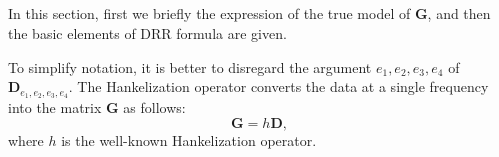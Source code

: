 %
%
%
%


\subsection{}

In this section, first we briefly  the expression of the true model of $\textbf{G}$, and then the basic elements of  DRR formula are given.

To simplify notation, it is better to disregard the argument {$e_1, e_2, e_3, e_4$} of {$\mathbf{D}_{e_1,e_2,e_3,e_4}$}. The Hankelization operator \citep{chen2016open,chen2016simultaneous,zhang2017hybrid} converts the  data at a single frequency into the matrix $\textbf{G}$ as follows:
\begin{equation}
\mathbf{G}=h\mathbf{D},                    
\end{equation}
where ${h}$ is the well-known Hankelization operator.

